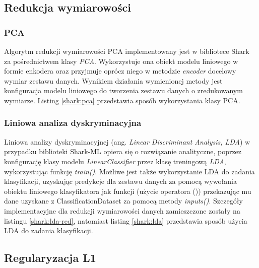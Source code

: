 
\subsection{Redukcja wymiarowości}
\subsubsection{PCA}
Algorytm redukcji wymiarowości PCA implementowany jest w bibliotece Shark za pośrednictwem klasy \textit{PCA}. Wykorzystuje ona obiekt modelu liniowego w formie enkodera oraz przyjmuje oprócz niego w metodzie \textit{encoder} docelowy wymiar zestawu danych. Wynikiem działania wymienionej metody jest konfiguracja modelu liniowego do tworzenia zestawu danych o zredukowanym wymiarze. Listing \ref{shark:pca} przedstawia sposób wykorzystania klasy PCA.

\newpage



\subsubsection{Liniowa analiza dyskryminacyjna}

Liniowa analizy dyskryminacyjnej (ang. \textit{Linear Discriminant Analysis, LDA}) w przypadku biblioteki Shark-ML opiera się o rozwiązanie analityczne, poprzez konfigurację klasy modelu \textit{LinearClassifier} przez klasę treningową \textit{LDA}, wykorzystując funkcję \textit{train()}. Możliwe jest także wykorzystanie LDA do zadania klasyfikacji, uzyskując predykcje dla zestawu danych za pomocą wywołania obiektu liniowego klasyfikatora jak funkcji (użycie operatora ()) przekazując mu dane uzyskane z ClassificationDataset za pomocą metody \textit{inputs()}. Szczegóły implementacyjne dla redukcji wymiarowości danych zamieszczone zostały na listingu \ref{shark:lda-red}, natomiast listing \ref{shark:lda} przedstawia sposób użycia LDA do zadania klasyfikacji.


\subsection{Regularyzacja L1}

